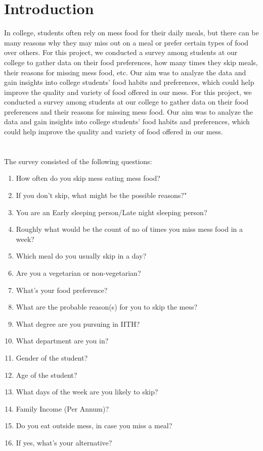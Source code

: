 \documentclass{article}
\begin{document}
\section{Introduction}
 In college, students often rely on mess food for their daily meals, but there can be many reasons why they may miss out on a meal or prefer certain types of food over others. For this project, we conducted a survey among students at our college to gather data on their food preferences, how many times they skip meals, their reasons for missing mess food, etc. Our aim was to analyze the data and gain insights into college students' food habits and preferences, which could help improve the quality and variety of food offered in our mess.
 For this project, we conducted a survey among students at our college to gather data on their food preferences and their reasons for missing mess food. Our aim was to analyze the data and gain insights into college students' food habits and preferences, which could help improve the quality and variety of food offered in our mess.\\\\\\
 The survey consisted of the following questions:
\begin{enumerate}
\item How often do you skip mess eating mess food?
\item If you don't skip, what might be the possible reasons?"
\item You are an Early sleeping person/Late night sleeping person?
\item Roughly what would be the count of no of times you miss mess food in a week?
\item Which meal do you usually skip in a day?
\item Are you a vegetarian or non-vegetarian?
\item What's your food preference?
\item What are the probable reason(s) for you to skip the mess?
\item What degree are you pursuing in IITH?
\item What department are you in?
\item Gender of the student?
\item Age of the student?
\item What days of the week are you likely to skip?
\item Family Income (Per Annum)?
\item Do you eat outside mess, in case you miss a meal?
\item If yes, what's your alternative? 
\end{enumerate}
\end{document}
